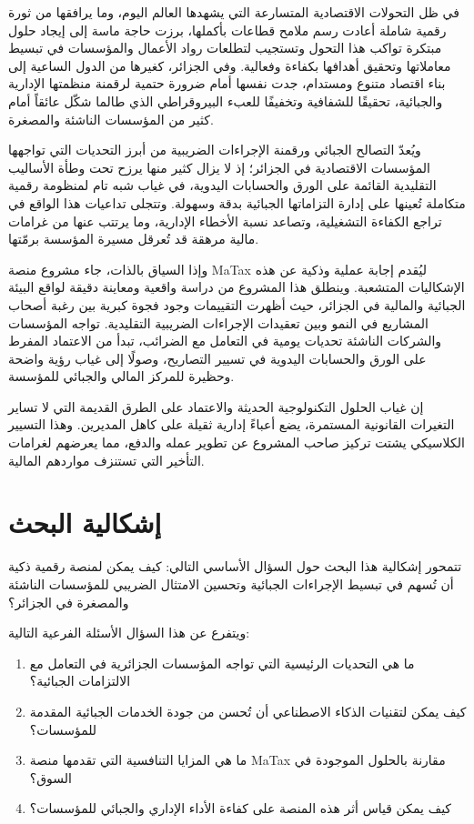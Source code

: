 \documentclass[12pt, a4paper, twoside]{report}
\begin{document}
في ظل التحولات الاقتصادية المتسارعة التي يشهدها العالم اليوم، وما يرافقها من ثورة رقمية شاملة أعادت رسم ملامح قطاعات بأكملها، برزت حاجة ماسة إلى إيجاد حلول مبتكرة تواكب هذا التحول وتستجيب لتطلعات رواد الأعمال والمؤسسات في تبسيط معاملاتها وتحقيق أهدافها بكفاءة وفعالية. وفي الجزائر، كغيرها من الدول الساعية إلى بناء اقتصاد متنوع ومستدام، جدت نفسها أمام ضرورة حتمية لرقمنة منظمتها الإدارية والجبائية، تحقيقًا للشفافية وتخفيفًا للعبء البيروقراطي الذي طالما شكّل عائقاً أمام كثير من المؤسسات الناشئة والمصغرة.

ويُعدّ التصالح الجبائي ورقمنة الإجراءات الضريبية من أبرز التحديات التي تواجهها المؤسسات الاقتصادية في الجزائر؛ إذ لا يزال كثير منها يرزح تحت وطأة الأساليب التقليدية القائمة على الورق والحسابات اليدوية، في غياب شبه تام لمنظومة رقمية متكاملة تُعينها على إدارة التزاماتها الجبائية بدقة وسهولة. وتتجلى تداعيات هذا الواقع في تراجع الكفاءة التشغيلية، وتصاعد نسبة الأخطاء الإدارية، وما يرتتب عنها من غرامات مالية مرهقة قد تُعرقل مسيرة المؤسسة برمّتها.

وإذا السياق بالذات، جاء مشروع منصة MaTax ليُقدم إجابة عملية وذكية عن هذه الإشكاليات المتشعبة. وينطلق هذا المشروع من دراسة واقعية ومعاينة دقيقة لواقع البيئة الجبائية والمالية في الجزائر، حيث أظهرت التقييمات وجود فجوة كبرية بين رغبة أصحاب المشاريع في النمو وبين تعقيدات الإجراءات الضريبية التقليدية. تواجه المؤسسات والشركات الناشئة تحديات يومية في التعامل مع الضرائب، تبدأ من الاعتماد المفرط على الورق والحسابات اليدوية في تسيير التصاريح، وصولًا إلى غياب رؤية واضحة وحظيرة للمركز المالي والجبائي للمؤسسة.

إن غياب الحلول التكنولوجية الحديثة والاعتماد على الطرق القديمة التي لا تساير التغيرات القانونية المستمرة، يضع أعباءً إدارية ثقيلة على كاهل المديرين. وهذا التسيير الكلاسيكي يشتت تركيز صاحب المشروع عن تطوير عمله والدفع، مما يعرضهم لغرامات التأخير التي تستنزف مواردهم المالية.

\section{إشكالية البحث}

تتمحور إشكالية هذا البحث حول السؤال الأساسي التالي: كيف يمكن لمنصة رقمية ذكية أن تُسهم في تبسيط الإجراءات الجبائية وتحسين الامتثال الضريبي للمؤسسات الناشئة والمصغرة في الجزائر؟

ويتفرع عن هذا السؤال الأسئلة الفرعية التالية:
\begin{enumerate}
    \item ما هي التحديات الرئيسية التي تواجه المؤسسات الجزائرية في التعامل مع الالتزامات الجبائية؟
    \item كيف يمكن لتقنيات الذكاء الاصطناعي أن تُحسن من جودة الخدمات الجبائية المقدمة للمؤسسات؟
    \item ما هي المزايا التنافسية التي تقدمها منصة MaTax مقارنة بالحلول الموجودة في السوق؟
    \item كيف يمكن قياس أثر هذه المنصة على كفاءة الأداء الإداري والجبائي للمؤسسات؟
\end{enumerate}
\end{document}
